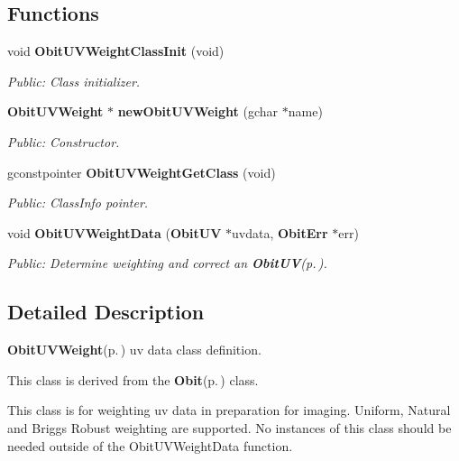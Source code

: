 \subsection*{Functions}
\begin{CompactItemize}
\item 
void {\bf Obit\-UVWeight\-Class\-Init} (void)
\begin{CompactList}\small\item\em Public: Class initializer. \item\end{CompactList}\item 
{\bf Obit\-UVWeight} $\ast$ {\bf new\-Obit\-UVWeight} (gchar $\ast$name)
\begin{CompactList}\small\item\em Public: Constructor. \item\end{CompactList}\item 
gconstpointer {\bf Obit\-UVWeight\-Get\-Class} (void)
\begin{CompactList}\small\item\em Public: Class\-Info pointer. \item\end{CompactList}\item 
void {\bf Obit\-UVWeight\-Data} ({\bf Obit\-UV} $\ast$uvdata, {\bf Obit\-Err} $\ast$err)
\begin{CompactList}\small\item\em Public: Determine weighting and correct an {\bf Obit\-UV}{\rm (p.\,\pageref{structObitUV})}. \item\end{CompactList}\end{CompactItemize}


\subsection{Detailed Description}
{\bf Obit\-UVWeight}{\rm (p.\,\pageref{structObitUVWeight})} uv data class definition. 

This class is derived from the {\bf Obit}{\rm (p.\,\pageref{structObit})} class.

This class is for weighting uv data in preparation for imaging. Uniform, Natural and Briggs Robust weighting are supported. No instances of this class should be needed outside of the Obit\-UVWeight\-Data function.

